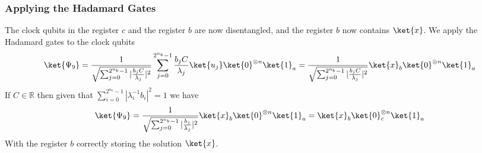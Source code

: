 \documentclass[10pt]{article}
\begin{document}
\subsubsection{Applying the Hadamard Gates}
The clock qubits in the register $c$ and the register $b$ are now disentangled, and the register $b$ now contains $\ket{x}$. We apply the Hadamard gates to the clock qubits
$$\ket{\Psi_9} = \frac{1}{\sqrt{\sum_{j=0}^{2^{n_b}-1}|\frac{b_jC}{\lambda_j}|^2}}\sum_{j=0}^{2^{n_b}-1}\frac{b_jC}{\lambda_j}\ket{u_j}\ket{0}^{\otimes n}\ket{1}_a =\frac{1}{\sqrt{\sum_{j=0}^{2^{n_b}-1}|\frac{b_jC}{\lambda_j}|^2}}\ket{x}_b\ket{0}^{\otimes n}\ket{1}_a$$
If $C\in\mathbb{R}$ then given that $\sum_{i=0}^{2^{n_b}-1}|\lambda_i^{-1}b_i|^2=1$ we have
$$\ket{\Psi_9}=\frac{1}{\sqrt{\sum_{j=0}^{2^{n_b}-1}|\frac{b_j}{\lambda_j}|^2}}\ket{x}_b\ket{0}^{\otimes n}\ket{1}_a=\ket{x}_b\ket{0}_c^{\otimes n}\ket{1}_a$$
With the register $b$ correctly storing the solution $\ket{x}$.
\end{document}
